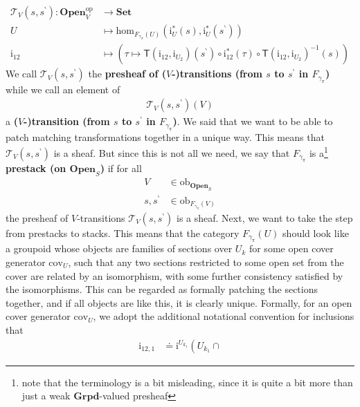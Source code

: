 \begin{exa}
\begin{align*}
  \mathcal{T}_{V}(s,s^{\backprime})
  \colon
  \mathbf{Open}_{V}^{\mathrm{op}}
  &\rightarrow
  \mathbf{Set}
  \\
  U
  &\mapsto
  \mathrm{hom}_{F_{\gamma_{\pi}}(U)}
  \left(
    \mathrm{i}_{U}^{\ast}(s),
    \mathrm{i}_{U}^{\ast}(s^{\backprime})
  \right)
  \\
  \mathrm{i}_{12}
  &\mapsto
  \left(
    \tau
    \mapsto
    \mathsf{T}(\mathrm{i}_{12},\mathrm{i}_{U_{2}})(s^{\backprime})
    \circ
    \mathrm{i}_{12}^{\ast}(\tau)
    \circ
    \mathsf{T}(\mathrm{i}_{12},\mathrm{i}_{U_{2}})^{-1}(s)
  \right)
\end{align*}
We call $\mathcal{T}_{V}(s,s^{\backprime})$ the \textbf{presheaf of ($V$-)transitions (from $s$ to $s^{\backprime}$ in $F_{\gamma_{\pi}}$)} while we call an element of
\begin{align*}
  \mathcal{T}_{V}(s,s^{\backprime})(V)
\end{align*}
a \textbf{($V$-)transition (from $s$ to $s^{\backprime}$ in $F_{\gamma_{\pi}}$)}.
We said that we want to be able to patch matching transformations together in a unique way.
This means that $\mathcal{T}_{V}(s,s^{\backprime})$ is a sheaf.
But since this is not all we need, we say that $F_{\gamma_{\pi}}$ is a\footnote{note that the terminology is a bit misleading, since it is quite a bit more than just a {\glqq}weak $\mathbf{Grpd}$-valued presheaf{\grqq}} \textbf{prestack (on $\mathbf{Open}_{S}$)} if for all
\begin{align*}
  V
  &\in
  \mathrm{ob}_{\mathbf{Open}_{S}}
  \\
  s,
  s^{\backprime}
  &\in
  \mathrm{ob}_{F_{\gamma_{\pi}}(V)}
\end{align*}
the presheaf of $V$-transitions $\mathcal{T}_{V}(s,s^{\backprime})$ is a sheaf.
Next, we want to take the step from prestacks to stacks.
This means that the category $F_{\gamma_{\pi}}(U)$ should look like a groupoid whose objects are families of sections over $U_{k}$ for some open cover generator $\mathrm{cov}_{U}$, such that any two sections restricted to some open set from the cover are related by an isomorphism, with some further consistency satisfied by the isomorphisms.
This can be regarded as formally patching the sections together, and if all objects are like this, it is clearly unique.
Formally, for an open cover generator $\mathrm{cov}_{U}$, we adopt the additional notational convention for inclusions that
\begin{align*}
  \mathrm{i}_{12,1}
  &\doteq
  \mathrm{i}^{U_{k_{1}}}
  \left(
    U_{k_{1}}
    \cap

\end{align*}
\end{exa}
